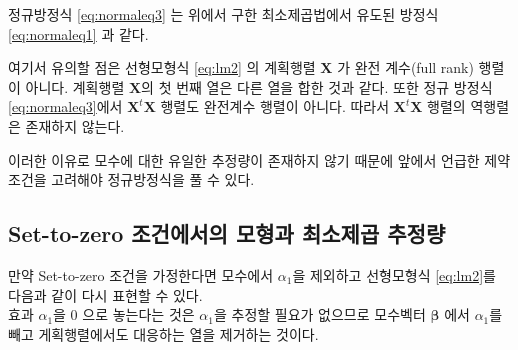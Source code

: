 \documentclass[
]{book}
\theoremstyle{definition}
\theoremstyle{definition}
\theoremstyle{definition}
\theoremstyle{definition}
\theoremstyle{remark}
\begin{document}
정규방정식 \eqref{eq:normaleq3} 는 위에서 구한 최소제곱법에서 유도된 방정식 \eqref{eq:normaleq1} 과 같다.

여기서 유의할 점은 선형모형식 \eqref{eq:lm2} 의 계획행렬 \(\bm X\) 가 완전 계수(full rank) 행렬이 아니다.
계획행렬 \(\bm X\)의 첫 번째 열은 다른 열을 합한 것과 같다.
또한 정규 방정식 \eqref{eq:normaleq3}에서 \(\bm X^t \bm X\) 행렬도 완전계수 행렬이 아니다.
따라서 \(\bm X^t \bm X\) 행렬의 역행렬은 존재하지 않는다.

이러한 이유로 모수에 대한 유일한 추정량이 존재하지 않기 때문에 앞에서 언급한 제약 조건을 고려해야 정규방정식을 풀 수 있다.

\hypertarget{set-to-zero-uxc870uxac74uxc5d0uxc11cuxc758-uxbaa8uxd615uxacfc-uxcd5cuxc18cuxc81cuxacf1-uxcd94uxc815uxb7c9}{%
\subsection{Set-to-zero 조건에서의 모형과 최소제곱 추정량}\label{set-to-zero-uxc870uxac74uxc5d0uxc11cuxc758-uxbaa8uxd615uxacfc-uxcd5cuxc18cuxc81cuxacf1-uxcd94uxc815uxb7c9}}

만약 Set-to-zero 조건을 가정한다면 모수에서 \(\alpha_1\)을 제외하고 선형모형식 \eqref{eq:lm2}를 다음과 같이 다시 표현할 수 있다.\\
효과 \(\alpha_1\)을 0 으로 놓는다는 것은 \(\alpha_1\)을 추정할 필요가 없으므로 모수벡터 \(\bm \beta\) 에서 \(\alpha_1\)를 빼고
게획행렬에서도 대응하는 열을 제거하는 것이다.
\end{document}
